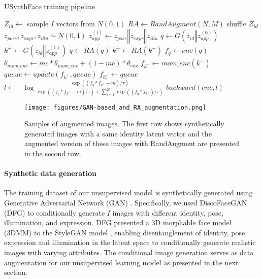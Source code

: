 \documentclass[10pt,twocolumn,letterpaper]{ieeeconf}
\begin{document}
\begin{algorithm}
\caption{USynthFace training pipeline}
\begin{algorithmic} 
\small
\STATE $Z_{id} \leftarrow$ sample $I$ vectors from $N(0,1)$
\STATE $RA \leftarrow RandAugment(N,M)$
\STATE shuffle $Z_{id}$
\STATE $z_{pose}, z_{expr}, z_{illu} \sim N(0,1)$
\STATE $z_{app}^{(i)} \leftarrow z_{pose} \mathbin\Vert z_{expr} \mathbin\Vert z_{illu}$
\ENDFOR
\STATE $q \leftarrow G(z_{id} \mathbin\Vert z_{app}^{(0)})$
\STATE $k^+ \leftarrow G(z_{id} \mathbin\Vert z_{app}^{(1)})$
\STATE $q \leftarrow RA(q)$
\STATE $k^+ \leftarrow RA(k^+)$
\STATE $f_q \leftarrow enc(q)$
\STATE $\theta_{mom\_enc} \leftarrow mc * \theta_{mom\_enc} + (1-mc)* \theta_{enc}$
\STATE $f_{k^+} \leftarrow mom\_enc(k^+)$
\STATE $queue \leftarrow update(f_{k^+}, queue)$
\STATE $f_{k_i^-} \leftarrow queue$
\STATE $l \leftarrow - \log\frac{\exp\left((f_q*f_{k^+} - m) / \tau \right)} {\exp\left((f_q*f_{k^+} - m) / \tau \right) + \sum_{i=1}^{K}\exp\left((f_q*f_{k^-_i} ) / \tau\right)}$
\STATE $backward(enc, l)$
\ENDFOR
\ENDWHILE
\end{algorithmic}
\end{algorithm}




\begin{figure}[ht!]
	\centering
	\texttt{[image: figures/GAN-based\_and\_RA\_augmentation.png]}
    \caption{Samples of augmented images.
The first row shows synthetically generated images with a same identity latent vector and the augmented version of these images with RandAugment are presented in the second row. }
	\label{fig:GAN_and_RA_augmentations}
	\vspace{-4mm}
\end{figure}


\paragraph{Synthetic data generation}
\label{sec:syn_data_generation}
The training dataset of our unsupervised model is synthetically generated using Generative Adversarial Network (GAN) \cite{GAN}. Specifically, we used DiscoFaceGAN (DFG) \cite{DiscoFaceGAN} to conditionally generate $I$ images with different identity, pose, illumination, and expression. 
DFG presented a 3D morphable face model (3DMM) \cite{3DMM} to the StyleGAN model \cite{StyleGAN}, enabling disentanglement of identity, pose, expression and illumination in the latent space to conditionally generate realistic images with varying attributes. 
The conditional image generation serves as data augmentation for our unsupervised learning model as presented in the next section. 
\end{document}
